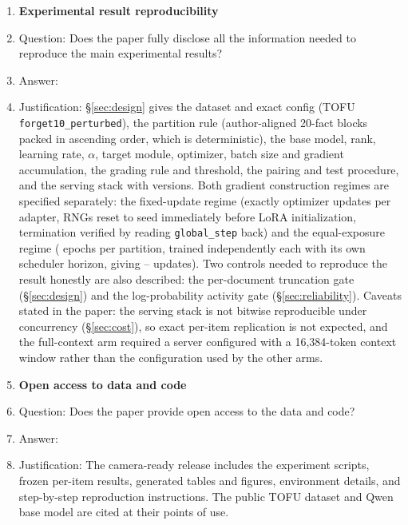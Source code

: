 \begin{enumerate}
\item {\bf Experimental result reproducibility}
    \item[] Question: Does the paper fully disclose all the information needed
    to reproduce the main experimental results?
    \item[] Answer: \answerYes{}
    \item[] Justification: \S\ref{sec:design} gives the dataset and exact config
    (TOFU \texttt{forget10\_perturbed}), the partition rule (author-aligned
    20-fact blocks packed in ascending order, which is deterministic), the base
    model, rank, learning rate, $\alpha$, target module, optimizer, batch size
    and gradient accumulation, the grading rule and threshold, the pairing and
    test procedure, and the serving stack with versions. Both gradient
    construction regimes are specified separately: the fixed-update regime
    (exactly \SeedSteps{} optimizer updates per adapter, RNGs reset to seed
    \SeedSeed{} immediately before LoRA initialization, termination verified by
    reading \texttt{global\_step} back) and the equal-exposure regime
    (\ExpEpochs{} epochs per partition, trained independently each with its own
    scheduler horizon, giving \ExpGTwentySteps{}--\ExpGTwoHundredSteps{}
    updates). Two controls needed to reproduce the result honestly are also
    described: the per-document truncation gate (\S\ref{sec:design}) and the
    log-probability activity gate (\S\ref{sec:reliability}). Caveats stated in
    the paper: the serving stack is not bitwise reproducible under concurrency
    (\S\ref{sec:cost}), so exact per-item replication is not expected, and the
    full-context arm required a server configured with a 16{,}384-token context
    window rather than the configuration used by the other arms.

\item {\bf Open access to data and code}
    \item[] Question: Does the paper provide open access to the data and code?
    \item[] Answer: \answerYes{}
    \item[] Justification: The camera-ready release includes the experiment
    scripts, frozen per-item results, generated tables and figures, environment
    details, and step-by-step reproduction instructions. The public TOFU
    dataset and Qwen base model are cited at their points of use.


\end{enumerate}
